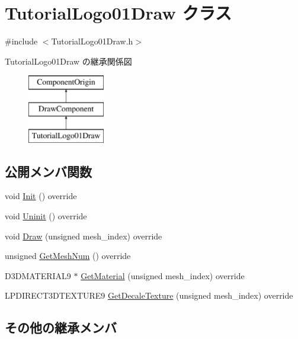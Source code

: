 \hypertarget{class_tutorial_logo01_draw}{}\section{Tutorial\+Logo01\+Draw クラス}
\label{class_tutorial_logo01_draw}


{\ttfamily \#include $<$Tutorial\+Logo01\+Draw.\+h$>$}

Tutorial\+Logo01\+Draw の継承関係図\begin{figure}[H]
\begin{center}
\leavevmode
\includegraphics[height=3.000000cm]{class_tutorial_logo01_draw}
\end{center}
\end{figure}
\subsection*{公開メンバ関数}
\begin{DoxyCompactItemize}
\item 
void \mbox{\hyperlink{class_tutorial_logo01_draw_a4ef239c2fcd12ddd8a0a9256bedacdcb}{Init}} () override
\item 
void \mbox{\hyperlink{class_tutorial_logo01_draw_ab27500ea1511726097dc9f81cefb9632}{Uninit}} () override
\item 
void \mbox{\hyperlink{class_tutorial_logo01_draw_a92e3c7b5fb5e068615418299c0ab2b8b}{Draw}} (unsigned mesh\+\_\+index) override
\item 
unsigned \mbox{\hyperlink{class_tutorial_logo01_draw_a08c17ba99169d9e8e57f9bc23d96c21c}{Get\+Mesh\+Num}} () override
\item 
D3\+D\+M\+A\+T\+E\+R\+I\+A\+L9 $\ast$ \mbox{\hyperlink{class_tutorial_logo01_draw_a82f716bcb21e3413237aa947ed7c7f51}{Get\+Material}} (unsigned mesh\+\_\+index) override
\item 
L\+P\+D\+I\+R\+E\+C\+T3\+D\+T\+E\+X\+T\+U\+R\+E9 \mbox{\hyperlink{class_tutorial_logo01_draw_a4c5ab0c5fd9b092b7a2e489ef2539a74}{Get\+Decale\+Texture}} (unsigned mesh\+\_\+index) override
\end{DoxyCompactItemize}
\subsection*{その他の継承メンバ}


